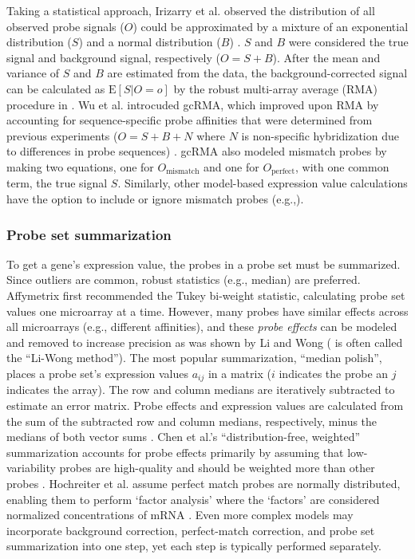 Taking a statistical approach, 
Irizarry et al. observed the distribution
of all observed probe signals ($O$) could be approximated by
a mixture of an exponential distribution ($S$) and a
normal distribution ($B$) \cite{Irizarry:2003ge}.
$S$ and $B$ were considered the true signal and background signal, respectively ($O=S+B$).
After the mean and variance of $S$ and $B$ are estimated from the data, 
the background-corrected signal can be calculated 
as $\text{E}[S|O=o]$ by the robust multi-array average (RMA) procedure in
\cite{Irizarry:2003ge}. 
Wu et al. introcuded gcRMA, which improved upon RMA by 
accounting for sequence-specific probe
affinities that were determined from previous experiments
($O=S+B+N$ where $N$ is non-specific hybridization due to
differences in probe sequences) \cite{Wu:2004wh}. gcRMA
also modeled mismatch probes by making two equations, one for 
$O_{\text{mismatch}}$ and one for $O_{\text{perfect}}$, with one common 
term, the true signal $S$. 
Similarly, other model-based expression value calculations
have the option to include or ignore
mismatch probes (e.g.,\cite{Li:2001jv,Milo:2003tt}).

\subsubsection{Probe set summarization}

To get a gene's expression value, the probes in a probe
set must be summarized. 
Since outliers are common, robust
statistics (e.g., median) are preferred.
Affymetrix first recommended the Tukey bi-weight
statistic, calculating probe set values one microarray at a time.
However, many probes have similar effects across all microarrays
(e.g., different affinities), and these \textit{probe effects} can 
be modeled and removed to increase precision as was shown by Li and Wong 
(\cite{Li:2001jv,Li:2001wk} is often called the ``Li-Wong method'').
The most popular summarization, ``median polish'', places a probe set's expression
values $a_{ij}$ in a matrix ($i$ indicates the probe an $j$ 
indicates the array). The row and column medians are 
iteratively subtracted to estimate an error matrix. Probe effects and
expression values are calculated from the sum of the subtracted row 
and column medians, respectively, minus the 
medians of both vector sums \cite{Mosteller:1977vp,Irizarry:2003ge}.  
Chen et al.'s ``distribution-free, weighted'' summarization
accounts for probe effects primarily by assuming that low-variability
probes are high-quality and should be weighted more 
than other probes \cite{Chen:2007cr}.
Hochreiter et al. assume perfect match probes are normally distributed, enabling
them to perform `factor analysis' 
where the `factors'
are considered normalized concentrations of mRNA \cite{Hochreiter:2006ja}. 
Even more complex models may incorporate 
background correction, perfect-match correction, and probe set summarization
into one step, yet each step is typically performed separately.

